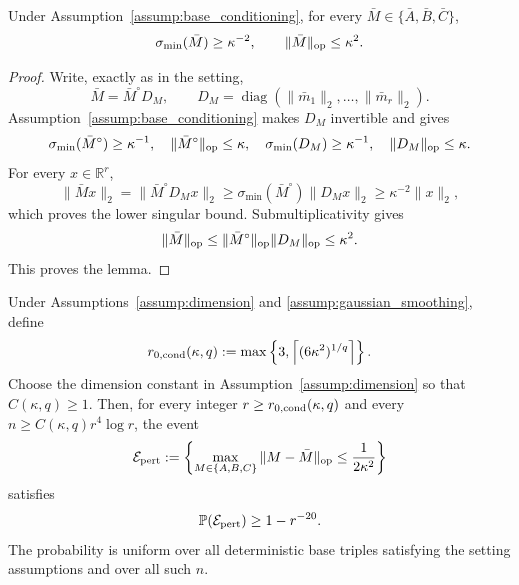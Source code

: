 \begin{lemma}
\label{lem:step-001-base-conditioning}
Under Assumption~\ref{assump:base_conditioning}, for every
\(\bar M\in\{\bar A,\bar B,\bar C\}\),
\[
  \sigma_{\min}(\bar M)\ge \kappa^{-2},
  \qquad
  \|\bar M\|_{\rm op}\le \kappa^2.
\]

\end{lemma}

\begin{proof}
Write, exactly as in the setting,
\[
  \bar M=\bar M^\circ D_M,
  \qquad
  D_M=\operatorname{diag}(\|\bar m_1\|_2,\ldots,
  \|\bar m_r\|_2).
\]
Assumption~\ref{assump:base_conditioning} makes \(D_M\) invertible and gives
\[
  \sigma_{\min}(\bar M^\circ)\ge\kappa^{-1},\quad
  \|\bar M^\circ\|_{\rm op}\le\kappa,\quad
  \sigma_{\min}(D_M)\ge\kappa^{-1},\quad
  \|D_M\|_{\rm op}\le\kappa.
\]
For every \(x\in\mathbb R^r\),
\[
  \|\bar Mx\|_2
  =\|\bar M^\circ D_Mx\|_2
  \ge \sigma_{\min}(\bar M^\circ)\|D_Mx\|_2
  \ge \kappa^{-2}\|x\|_2,
\]
which proves the lower singular bound. Submultiplicativity gives
\[
  \|\bar M\|_{\rm op}
  \le \|\bar M^\circ\|_{\rm op}\|D_M\|_{\rm op}
  \le \kappa^2.
\]
This proves the lemma. 

\end{proof}


\begin{lemma}
\label{lem:step-001-gaussian-perturbation}
Under Assumptions~\ref{assump:dimension} and
\ref{assump:gaussian_smoothing}, define
\[
  r_{0,\rm cond}(\kappa,q)
  :=\max\left\{3,\left\lceil(6\kappa^2)^{1/q}\right\rceil\right\}.
\]
Choose the dimension constant in Assumption~\ref{assump:dimension} so that
\(C(\kappa,q)\ge1\). Then, for every integer
\(r\ge r_{0,\rm cond}(\kappa,q)\) and every
\(n\ge C(\kappa,q)r^4\log r\), the event
\[
  \mathcal E_{\rm pert}
  :=\left\{
    \max_{M\in\{A,B,C\}}\|M-\bar M\|_{\rm op}
    \le \frac1{2\kappa^2}
  \right\}
\]
satisfies
\[
  \mathbb P(\mathcal E_{\rm pert})\ge1-r^{-20}.
\]
The probability is uniform over all deterministic base triples satisfying the
setting assumptions and over all such \(n\).

\end{lemma}

